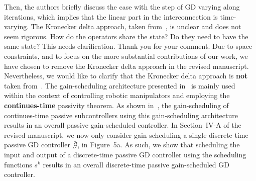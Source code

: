 \begin{rebuttal}[pending]
    {%
        Then, the authors briefly discuss the case with the step of GD varying along iterations, which implies that the linear part in the interconnection is time-varying. The Kronecker delta approach, taken from~\cite{Damaren_spr_gain_scheduling_1996}, is unclear and does not seem rigorous. How do the operators share the state? Do they need to have the same state? This needs clarification. 
    }%
    {%
        Thank you for your comment. Due to space constraints, and to focus on the more substantial contributions of our work, we have chosen to remove the Kronecker delta approach in the revised manuscript. Nevertheless, we would like to clarify that the Kronecker delta approach is \textbf{not} taken from~\cite{Damaren_spr_gain_scheduling_1996}. The gain-scheduling architecture presented in~\cite{Damaren_spr_gain_scheduling_1996} is mainly used within the context of controlling robotic manipulators and employing the \textbf{continues-time} passivity theorem. As shown in~\cite{Damaren_spr_gain_scheduling_1996}, the gain-scheduling of continues-time passive subcontrollers using this gain-scheduling architecture results in an overall passive gain-scheduled controller. In \mbox{Section~IV-A} of the revised manuscript, we now only consider gain-scheduling a single discrete-time passive GD controller \(\bar{\bm{\mathcal{G}}}\), in Figure~5a. As such, we show that scheduling the input and output of a discrete-time passive GD controller using the scheduling functions \(s^k\) results in an overall discrete-time passive gain-scheduled GD controller.
    }%
\end{rebuttal}
